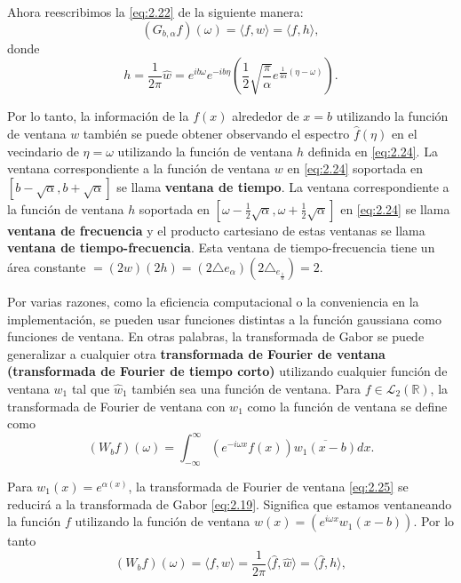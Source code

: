 \begin{multicols}{2}
Ahora reescribimos la \ref{eq:2.22} de la siguiente manera:
\begin{equation}
	(G_{b,\alpha} f)(\omega) = \langle f,w \rangle = \langle \hat{f}, h \rangle,
\label{eq:2.24}
\end{equation}
donde  
$$h = \frac{1}{2\pi} \hat{w} = e^{ib\omega} e^{-ib\eta} \left( \frac{1}{2} \sqrt{\frac{\pi}{\alpha}} e^{\frac{1}{4\alpha}(\eta - \omega)} \right).$$

Por lo tanto, la información de la $f(x)$ alrededor de $x = b$ utilizando la función de ventana $w$ también se puede obtener observando el espectro $\hat{f}(\eta)$ en el vecindario de $\eta = \omega$ utilizando la función de ventana $h$ definida en \ref{eq:2.24}. La ventana correspondiente a la función de ventana $w$ en \ref{eq:2.24} soportada en $[b - \sqrt{\alpha}, b + \sqrt{\alpha}]$ se llama \textbf{ventana de tiempo}. La ventana correspondiente a la función de ventana $h$ soportada en $[\omega - \frac{1}{2}\sqrt{\alpha}, \omega + \frac{1}{2}\sqrt{\alpha}]$ en \ref{eq:2.24} se llama \textbf{ventana de frecuencia} y el producto cartesiano de estas ventanas se llama \textbf{ventana de tiempo-frecuencia}. Esta ventana de tiempo-frecuencia tiene un área constante $= (2w)(2h) = (2\triangle{e_{\alpha}})(2\triangle_{e_{\frac{1}{\alpha}}}) = 2$.



Por varias razones, como la eficiencia computacional o la conveniencia en la implementación, se pueden usar funciones distintas a la función gaussiana como funciones de ventana. En otras palabras, la transformada de Gabor se puede generalizar a cualquier otra \textbf{transformada de Fourier de ventana (transformada de Fourier de tiempo corto)} utilizando cualquier función de ventana $w_1$ tal que $\hat{w}_1$ también sea una función de ventana. Para $f \in \mathcal{L}_2(\mathbb{R})$, la transformada de Fourier de ventana con $w_1$ como la función de ventana se define como
\begin{equation}
    (W_b f)(\omega) = \int_{-\infty}^{\infty} (e^{-i\omega x} f(x))\overline{w_1(x - b)} dx.
\label{eq:2.25}
\end{equation}

Para $w_1(x) = e^{\alpha(x)}$, la transformada de Fourier de ventana \ref{eq:2.25} se reducirá a la transformada de Gabor \ref{eq:2.19}. Significa que estamos ventaneando la función $f$ utilizando la función de ventana $w(x) = (e^{i\omega x}w_1(x - b))$. Por lo tanto
\begin{equation}\label{eq:2.26}
(W_b f)(\omega) = \langle f,w \rangle = \frac{1}{2\pi} \langle \hat{f}, \hat{w} \rangle = \langle \hat{f}, h \rangle,
\end{equation}


\end{multicols}
